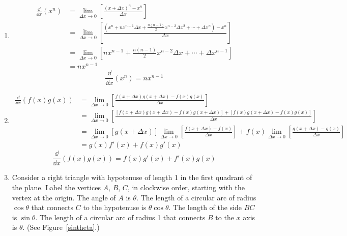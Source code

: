 


















\begin{Solution}
  \label{solution differentiation properties}
  \renewcommand{\theenumi}{\alph{enumi}}
  \begin{enumerate}
  \item
    \begin{align*}
      \frac{\dd}{\dd x} (x^n)
      &= \lim_{\Delta x \to 0} \left[ \frac{(x+\Delta x)^n - x^n}{\Delta x}
      \right] \\
      &= \lim_{\Delta x \to 0} \left[ \frac{\left( x^n + n x^{n-1} \Delta x +
            \frac{n(n-1)}{2} x^{n-2} \Delta x^2 + \cdots +
            \Delta x^n \right)- x^n}{\Delta x} \right] \\
      &= \lim_{\Delta x \to 0} \left[ n x^{n-1} +
        \frac{n(n-1)}{2} x^{n-2} \Delta x + \cdots +
        \Delta x^{n-1} \right] \\
      &= n x^{n-1}
    \end{align*}
    \[
    \boxed{
      \frac{\dd}{\dd x} (x^n) = n x^{n-1}
      }
    \]
  \item
    \begin{align*}
      \frac{\dd}{\dd x} (f(x) g(x))
      &= \lim_{\Delta x \to 0} \left[ \frac{f(x+\Delta x) g(x+\Delta x)
          - f(x) g(x)} {\Delta x} \right] \\
      &= \lim_{\Delta x \to 0} \left[ \frac{[f(x+\Delta x) g(x+\Delta x)
          - f(x) g(x+\Delta x)] + [f(x) g(x+\Delta x)- f(x) g(x)]}
        {\Delta x} \right] \\
      &= \lim_{\Delta x \to 0} \left[ g(x+\Delta x) \right]
      \lim_{\Delta x \to 0} \left[ \frac{f(x+\Delta x) - f(x)}
        {\Delta x} \right] +
      f(x) \lim_{\Delta x \to 0} \left[ \frac{g(x+\Delta x)- g(x)}
        {\Delta x} \right] \\
      &= g(x) f'(x) + f(x) g'(x)
    \end{align*}
    \[
    \boxed{
      \frac{\dd}{\dd x} (f(x) g(x)) = f(x) g'(x) + f'(x) g(x)
      }
    \]
  \item
    Consider a right triangle with hypotenuse of length 1 in the first
    quadrant of the plane. Label the vertices $A$, $B$, $C$, in clockwise order,
    starting with the vertex at the origin.  The angle of $A$ is $\theta$.
    The length of a circular arc of radius $\cos \theta$ that connects $C$ to
    the hypotenuse is $\theta \cos \theta$.  The length of the side $BC$ is
    $\sin \theta$.  The length of a circular arc of radius 1 that connects $B$
    to the $x$ axis is $\theta$.  (See Figure~\ref{sintheta}.)


\end{enumerate}
\end{Solution}
